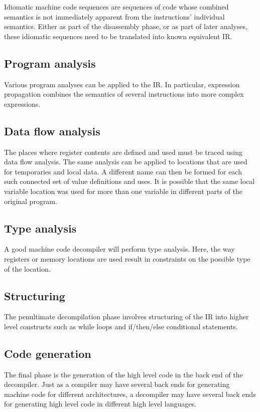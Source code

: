 Idiomatic machine code sequences are sequences of code whose combined semantics is not immediately apparent from the instructions' individual semantics. Either as part of the disassembly phase, or as part of later analyses, these idiomatic sequences need to be translated into known equivalent IR.

\subsection{Program analysis}

Various program analyses can be applied to the IR. In particular, expression propagation combines the semantics of several instructions into more complex expressions.

\subsection{Data flow analysis}

The places where register contents are defined and used must be traced using data flow analysis. The same analysis can be applied to locations that are used for temporaries and local data. A different name can then be formed for each such connected set of value definitions and uses. It is possible that the same local variable location was used for more than one variable in different parts of the original program.

\subsection{Type analysis}

A good machine code decompiler will perform type analysis. Here, the way registers or memory locations are used result in constraints on the possible type of the location.

\subsection{Structuring}

The penultimate decompilation phase involves structuring of the IR into higher level constructs such as while loops and if/then/else conditional statements.

\subsection{Code generation}

The final phase is the generation of the high level code in the back end of the decompiler. Just as a compiler may have several back ends for generating machine code for different architectures, a decompiler may have several back ends for generating high level code in different high level languages.